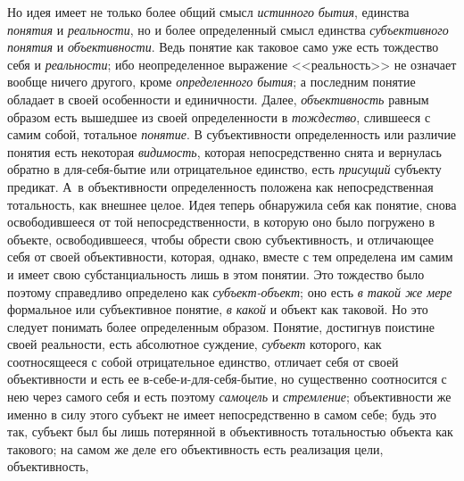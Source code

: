 {{Но идея имеет не только более общий смысл
{\em истинного}
{\em бытия}, единства
{\em понятия} и
{\em реальности}, но и
более определенный смысл единства
{\em субъективного понятия}
и {\em объективности}.
Ведь понятие как таковое само уже есть тождество себя и
{\em реальности}; ибо
неопределенное выражение <<реальность>> не означает вообще ничего другого,
кроме {\em определенного бытия};
а последним понятие обладает в своей особенности и
единичности. Далее, {\em объективность}
равным образом есть вышедшее из своей определенности в
{\em тождество},
слившееся с самим собой, тотальное
{\em понятие}. В
субъективности определенность или различие понятия есть некоторая
{\em видимость}, которая
непосредственно снята и вернулась обратно в для-себя-бытие или
отрицательное единство, есть
{\em присущий} субъекту
предикат. А~в объективности определенность положена как непосредственная
тотальность, как внешнее целое. Идея теперь обнаружила себя как понятие,
снова освободившееся от той непосредственности, в которую оно было
погружено в объекте, освободившееся, чтобы обрести свою субъективность, и
отличающее себя от своей объективности, которая, однако, вместе с тем
определена им самим и имеет свою субстанциальность лишь в этом понятии. Это
тождество было поэтому справедливо определено как
{\em субъект-объект};
оно есть {\em в такой же
мере} формальное или субъективное понятие,
{\em в какой} и объект
как таковой. Но это следует понимать более определенным образом. Понятие,
достигнув поистине своей реальности, есть абсолютное суждение,
{\em субъект} которого,
как соотносящееся с собой отрицательное единство, отличает
себя от своей объективности и есть ее в-себе-и-для-себя-бытие, но
существенно соотносится с нею через самого себя и есть поэтому
{\em самоцель} и
{\em стремление};
объективности же именно в силу этого субъект не имеет
непосредственно в самом себе; будь это так, субъект был бы лишь потерянной
в объективность тотальностью объекта как такового; на самом же деле его
объективность есть реализация цели, объективность,
}}
